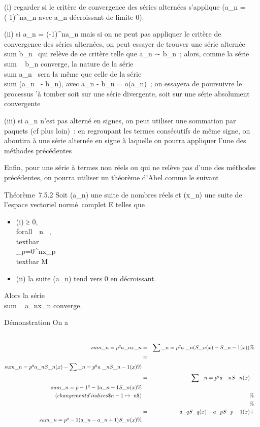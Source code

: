 \documentclass[]{article}
\begin{document}
(i) regarder si le critère de convergence des séries alternées
s'applique (a\_n =
(-1)^n\textbar{}a\_n\textbar{} avec
\textbar{}a\_n\textbar{} décroissant de limite 0).

(ii) si a\_n = (-1)^n\textbar{}a\_n\textbar{}
mais si on ne peut pas appliquer le critère de convergence des séries
alternées, on peut essayer de trouver une série alternée
\\sum  b\_n~ qui
relève de ce critère telle que a\_n ∼ b\_n~; alors,
comme la série \\sum ~
b\_n converge, la nature de la série
\\sum  a\_n~ sera
la même que celle de la série
\\sum  (a\_n~ -
b\_n), avec a\_n - b\_n = o(a\_n)~; on
essayera de poursuivre le processus \jmathusqu'à tomber soit sur une série
divergente, soit sur une série absolument convergente

(iii) si a\_n n'est pas alterné en signes, on peut utiliser une
sommation par paquets (cf plus loin)~: en regroupant les termes
consécutifs de même signe, on aboutira à une série alternée en signe à
laquelle on pourra appliquer l'une des méthodes précédentes

Enfin, pour une série à termes non réels ou qui ne relève pas d'une des
méthodes précédentes, on pourra utiliser un théorème d'Abel comme le
suivant

Théorème~7.5.2 Soit (a\_n) une suite de nombres réels et
(x\_n) une suite de l'espace vectoriel normé~complet E telles
que

\begin{itemize}
\itemsep1pt\parskip0pt
\item
  (i) \existsM ≥ 0, \\forall~~n \in
  ~,
  \\textbar{}\\\sum
   \_p=0^nx\_p\\textbar{} \leq M
\item
  (ii) la suite (a\_n) tend vers 0 en décroissant.
\end{itemize}

Alors la série \\sum ~
a\_nx\_n converge.

Démonstration On a

\begin{align*} \\sum
\_n=p^qa\_ nx\_n& =&
\sum \_n=p^qa~\_
n(S\_n(x) - S\_n-1(x)) \%&
\\ & =& \\sum
\_n=p^qa\_ nS\_n(x)
-\sum \_n=p^qa~\_
nS\_n-1(x) \%& \\ & =&
\sum \_n=p^qa~\_
nS\_n(x) -\\sum
\_n=p-1^q-1a\_ n+1S\_n(x) \%&
\\ \text (changement
d'indices \$n - 1\mapsto~n\$)&& \%&
\\ & & \%&
\\ & =& a\_qS\_q(x) -
a\_pS\_p-1(x) + \\sum
\_n=p^q-1(a\_ n -
a\_n+1)S\_n(x)\%& \\
\end{align*}
\end{document}

